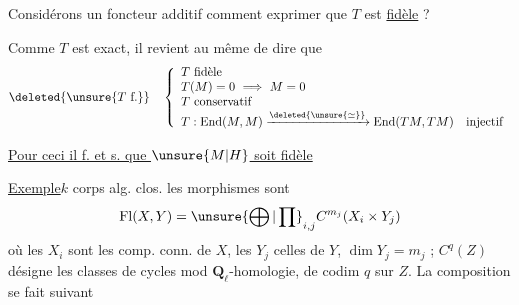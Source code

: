 Considérons un foncteur additif
comment exprimer que $T$ est \uline{fidèle} ?

Comme $T$ est exact, il revient au même de dire que
\[
\deleted{\unsure{T\text{ f.}}}\quad
\left\{\begin{array}{l}
T\text{ fidèle}\\
T(M)=0\ \Longrightarrow\ M=0\\
T\text{ conservatif}\\
T:\operatorname{End}(M,M)\xrightarrow{\deleted{\unsure{\simeq}}}\operatorname{End}(TM,TM)\quad\text{injectif}
\end{array}\right.
\]

\uline{Pour ceci il f. et s. que $\unsure{M|H}$ soit fidèle}


\uline{Exemple}\qquad $k$ corps alg. clos.
les morphismes sont
\[
\operatorname{Fl}(X,Y)=\unsure{\bigoplus|\prod}_{i,j} C^{m_j}(X_i\times Y_j)
\]
où les $X_i$ sont les comp. conn. de $X$, les $Y_j$ celles de $Y$, $\dim Y_j=m_j$ ; $C^q(Z)$ désigne les classes de cycles mod $\mathbf Q_\ell$-homologie, de codim $q$ sur $Z$. La composition se fait suivant
